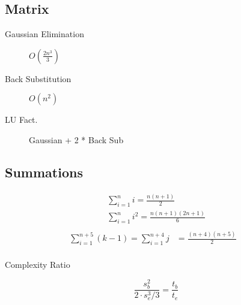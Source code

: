 \documentclass[10pt]{article}
\begin{document}
\begin{multicols}{3}
    \begin{minipage}{\columnwidth}
        \subsection*{Matrix}
        \begin{description}
            \item[Gaussian Elimination] \(O(\frac{2n^3}{3})\)
            \item[Back Substitution] \(O(n^2)\)
            \item[LU Fact.] Gaussian + 2 * Back Sub
        \end{description}
    \end{minipage}

    \begin{minipage}{\columnwidth}
        \subsection*{Summations}
        \begin{multicols}{2}
            \vspace*{-2em}
            \begin{equation*}
                \begin{aligned}
                    & \sum_{i=1}^{n} i = \frac{n(n+1)}{2} & \\
                    & \sum_{i=1}^{n} i^2 = \frac{n(n+1)(2n+1)}{6} & \\
                \end{aligned}
            \end{equation*}
            \columnbreak
            \vspace*{-2.0em}
            \begin{equation*}
                \begin{aligned}
                    \sum_{i=1}^{n+5}{(k-1)} = \sum_{i=1}^{n+4} j & = \frac{(n+4)(n+5)}{2} & \\
                \end{aligned}
            \end{equation*}
        \end{multicols}
    \end{minipage}

    \begin{minipage}{1.5\columnwidth}
        \begin{center}
            Complexity Ratio
        \end{center}
        \begin{equation*}
            \frac{s_b^2}{2\cdot s_e^3 / 3} = \frac{t_b}{t_e}
        \end{equation*}
    \end{minipage}
\end{multicols}
\end{document}
